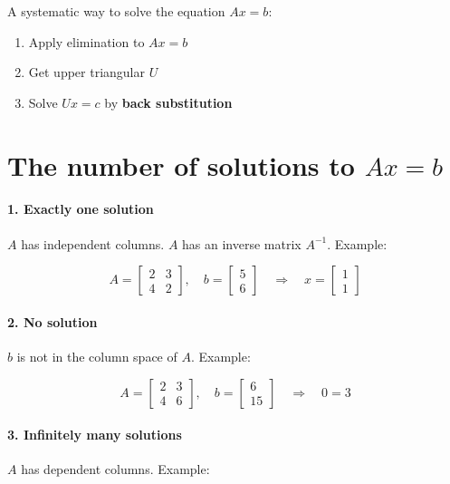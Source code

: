 \noindent A systematic way to solve the equation $Ax=b$:
\begin{enumerate}
    \item Apply elimination to $Ax=b$
    \item Get upper triangular $U$
    \item Solve $Ux=c$ by \textbf{back substitution}
\end{enumerate}

\section{The number of solutions to $Ax=b$}

\paragraph{1. Exactly one solution} $A$ has independent columns. $A$ has an inverse matrix $A^{-1}$. Example:

\[
    A =
    \begin{bmatrix}
        2 & 3 \\
        4 & 2
    \end{bmatrix},
    \quad
    b =
    \begin{bmatrix}
        5 \\ 6
    \end{bmatrix}
    \quad\Rightarrow\quad
    x =
    \begin{bmatrix}
        1 \\ 1
    \end{bmatrix}
\]

\paragraph{2. No solution} $b$ is not in the column space of $A$. Example:

\[
    A =
    \begin{bmatrix}
        2 & 3 \\
        4 & 6
    \end{bmatrix},
    \quad
    b =
    \begin{bmatrix}
        6 \\ 15
    \end{bmatrix}
    \quad\Rightarrow\quad
    0=3
\]

\paragraph{3. Infinitely many solutions} $A$ has dependent columns. Example:

